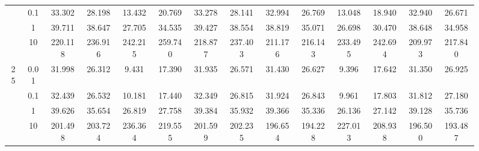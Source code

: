 \documentclass[11pt]{article}
\theoremstyle{definition}
\begin{document}
\begin{sidewaysfigure}
\begin{tabular}{cc|cccccc|cccccc}
  & 0.1 & 33.302 & 28.198 & 13.432 & 20.769 & 33.278 & 28.141 & 32.994 & 26.769 & 13.048 & 18.940 & 32.940 & 26.671 \\ 
   & 1   & 39.711 & 38.647 & 27.705 & 34.535 & 39.427 & 38.554 & 38.819 & 35.071 & 26.698 & 30.470 & 38.648 & 34.958 \\ 
   & 10   & 220.118 & 236.916 & 242.215 & 259.740 & 218.877 & 237.403 & 211.176 & 216.143 & 233.495 & 242.694 & 209.973 & 217.840 \\[.3cm]  
\multirow{4}{*}{25}   & 0.01 & 31.998 & 26.312 & 9.431 & 17.390 & 31.935 & 26.571 & 31.430 & 26.627 & 9.396 & 17.642 & 31.350 & 26.925 \\ 
  & 0.1 & 32.439 & 26.532 & 10.181 & 17.440 & 32.349 & 26.815 & 31.924 & 26.843 & 9.961 & 17.803 & 31.812 & 27.180 \\ 
   & 1   & 39.626 & 35.654 & 26.819 & 27.758 & 39.384 & 35.932 & 39.366 & 35.336 & 26.136 & 27.142 & 39.128 & 35.736 \\ 
& 10   & 201.498 & 203.724 & 236.364 & 219.555 & 201.599 & 202.235 & 196.654 & 194.228 & 227.013 & 208.938 & 196.500 & 193.487 \\ 
\end{tabular}
\end{sidewaysfigure}
\end{document}
